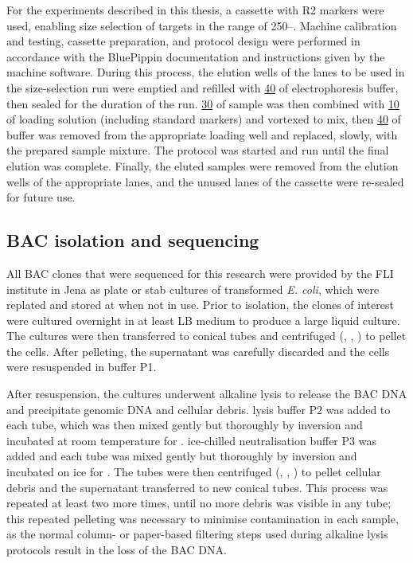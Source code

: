 For the experiments described in this thesis, a  cassette with R2 markers were used, enabling size selection of targets in the range of 250--. %
Machine calibration and testing, cassette preparation, and protocol design were performed in accordance with the BluePippin documentation and instructions given by the machine software. During this process, the elution wells of the lanes to be used in the size-selection run were emptied and refilled with \ul{40} of electrophoresis buffer, then sealed for the duration of the run. %
\ul{30} of sample was then combined with \ul{10} of loading solution (including standard markers) and vortexed to mix, then \ul{40} of buffer was removed from the appropriate loading well and replaced, slowly, with the prepared sample mixture. The protocol was started and run until the final elution was complete. Finally, the eluted samples were removed from the elution wells of the appropriate lanes, and the unused lanes of the cassette were re-sealed for future use.

\subsection{BAC isolation and sequencing}
\label{sec:methods_molec_bacs}

All BAC clones that were sequenced for this research were provided by the FLI institute in Jena as plate or stab cultures of transformed \textit{E. coli}, which were replated and stored at  when not in use. Prior to isolation, the clones of interest were cultured overnight in at least  LB medium to produce a large liquid culture. The cultures were then transferred to  conical tubes and centrifuged (, , ) to pellet the cells. After pelleting, the supernatant was carefully discarded and the cells were resuspended in  buffer P1.

After resuspension, the cultures underwent alkaline lysis to release the BAC DNA and precipitate genomic DNA and cellular debris.  lysis buffer P2 was added to each tube, which was then mixed gently but thoroughly by inversion and incubated at room temperature for .  ice-chilled neutralisation buffer P3 was added and each tube was mixed gently but thoroughly by inversion and incubated on ice for . The tubes were then centrifuged (, , ) to pellet cellular debris and the supernatant transferred to new conical tubes. This process was repeated at least two more times, until no more debris was visible in any tube; this repeated pelleting was necessary to minimise contamination in each sample, as the normal column- or paper-based filtering steps used during alkaline lysis protocols result in the loss of the BAC DNA.


